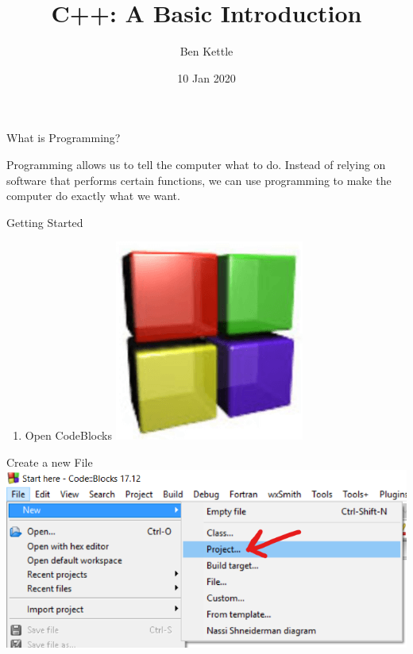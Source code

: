 \documentclass{beamer}
\title{C++: A Basic Introduction}
\author{Ben Kettle}
\date{10 Jan 2020}
\begin{document}
 
\frame{\titlepage}

\begin{frame}{What is Programming?}

Programming allows us to tell the computer what to do. Instead of relying on software that performs certain functions, we can use programming to make the computer do exactly what we want. 
    
\end{frame}

\begin{frame}{Getting Started}
    \begin{enumerate}
        \item Open CodeBlocks \includegraphics[scale=.1]{codeblockslogo.png}
    \end{enumerate}
\end{frame}

\begin{frame}{Create a new File}
    \includegraphics[scale=.5]{codeblockssetup1.png}
\end{frame}
\end{document}

